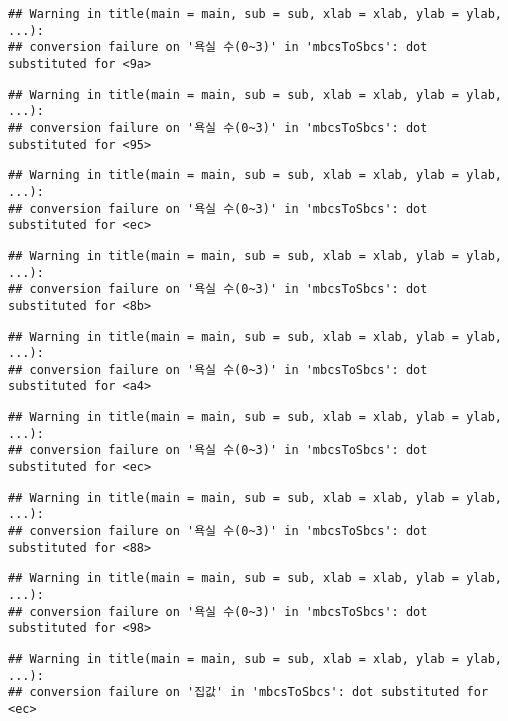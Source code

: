 \documentclass[
]{article}
\begin{document}
\begin{verbatim}
## Warning in title(main = main, sub = sub, xlab = xlab, ylab = ylab, ...):
## conversion failure on '욕실 수(0~3)' in 'mbcsToSbcs': dot substituted for <9a>
\end{verbatim}

\begin{verbatim}
## Warning in title(main = main, sub = sub, xlab = xlab, ylab = ylab, ...):
## conversion failure on '욕실 수(0~3)' in 'mbcsToSbcs': dot substituted for <95>
\end{verbatim}

\begin{verbatim}
## Warning in title(main = main, sub = sub, xlab = xlab, ylab = ylab, ...):
## conversion failure on '욕실 수(0~3)' in 'mbcsToSbcs': dot substituted for <ec>
\end{verbatim}

\begin{verbatim}
## Warning in title(main = main, sub = sub, xlab = xlab, ylab = ylab, ...):
## conversion failure on '욕실 수(0~3)' in 'mbcsToSbcs': dot substituted for <8b>
\end{verbatim}

\begin{verbatim}
## Warning in title(main = main, sub = sub, xlab = xlab, ylab = ylab, ...):
## conversion failure on '욕실 수(0~3)' in 'mbcsToSbcs': dot substituted for <a4>
\end{verbatim}

\begin{verbatim}
## Warning in title(main = main, sub = sub, xlab = xlab, ylab = ylab, ...):
## conversion failure on '욕실 수(0~3)' in 'mbcsToSbcs': dot substituted for <ec>
\end{verbatim}

\begin{verbatim}
## Warning in title(main = main, sub = sub, xlab = xlab, ylab = ylab, ...):
## conversion failure on '욕실 수(0~3)' in 'mbcsToSbcs': dot substituted for <88>
\end{verbatim}

\begin{verbatim}
## Warning in title(main = main, sub = sub, xlab = xlab, ylab = ylab, ...):
## conversion failure on '욕실 수(0~3)' in 'mbcsToSbcs': dot substituted for <98>
\end{verbatim}

\begin{verbatim}
## Warning in title(main = main, sub = sub, xlab = xlab, ylab = ylab, ...):
## conversion failure on '집값' in 'mbcsToSbcs': dot substituted for <ec>
\end{verbatim}
\end{document}
